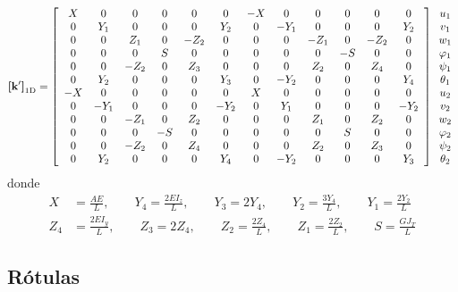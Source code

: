 \begin{equation}\label{eq:matrizRigidezTimoshenko} \boldsymbol{[}\mathbf{k'} \boldsymbol{]}_{\mathrm{1D}} = \left[\begin{array}{cccccccccccc} X & 0 & 0 & 0 & 0 & 0 & -X & 0 & 0 & 0 & 0 & 0\\ 0 & Y_{1} & 0 & 0 & 0 & Y_{2} & 0 & -Y_{1} & 0 & 0 & 0 & Y_{2}\\ 0 & 0 & Z_{1} & 0 & -Z_{2} & 0 & 0 & 0 & -Z_{1} & 0 & -Z_{2} & 0\\ 0 & 0 & 0 & S & 0 & 0 & 0 & 0 & 0 & -S & 0 & 0\\ 0 & 0 & -Z_{2} & 0 & Z_{3} & 0 & 0 & 0 & Z_{2} & 0 & Z_{4} & 0\\ 0 & Y_{2} & 0 & 0 & 0 & Y_{3} & 0 & -Y_{2} & 0 & 0 & 0 & Y_{4}\\ -X & 0 & 0 & 0 & 0 & 0 & X & 0 & 0 & 0 & 0 & 0\\ 0 & -Y_{1} & 0 & 0 & 0 & -Y_{2} & 0 & Y_{1} & 0 & 0 & 0 & -Y_{2}\\ 0 & 0 & -Z_{1} & 0 & Z_{2} & 0 & 0 & 0 & Z_{1} & 0 & Z_{2} & 0\\ 0 & 0 & 0 & -S & 0 & 0 & 0 & 0 & 0 & S & 0 & 0\\ 0 & 0 & -Z_{2} & 0 & Z_{4} & 0 & 0 & 0 & Z_{2} & 0 & Z_{3} & 0\\ 0 & Y_{2} & 0 & 0 & 0 & Y_{4} & 0 & -Y_{2} & 0 & 0 & 0 & Y_{3} \end{array}\right]\begin{array}{c}
u_1\\
v_1 \\
w_1 \\
\varphi_1 \\
\psi_1 \\
\theta_1 \\
u_2\\
v_2 \\
w_2 \\
\varphi_2 \\
\psi_2 \\
\theta_2 
\end{array}
\end{equation} 
donde  
\begin{align*}
	X&=\frac{AE}{L}, \qquad Y_4 = \frac{2EI_z}{L}, \qquad Y_3 = 2Y_4, \qquad Y_2 = \frac{3Y_4}{L} ,\qquad Y_1 = \frac{2Y_2}{L} \\
	Z_4 &= \frac{2EI_y}{L}, \qquad Z_3=2Z_4, \qquad Z_2 = \frac{2Z_4}{L}, \qquad Z_1 = \frac{2Z_2}{L}, \qquad S = \frac{G J_T}{L}
\end{align*}

\subsection*{Rótulas}

